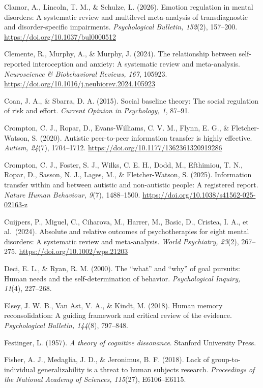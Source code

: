 \documentclass[
  11pt,
]{article}
\begin{document}
Clamor, A., Lincoln, T. M., \& Schulze, L. (2026). Emotion regulation in
mental disorders: A systematic review and multilevel meta-analysis of
transdiagnostic and disorder-specific impairments. \emph{Psychological
Bulletin, 152}(2), 157--200. \url{https://doi.org/10.1037/bul0000512}

Clemente, R., Murphy, A., \& Murphy, J. (2024). The relationship between
self-reported interoception and anxiety: A systematic review and
meta-analysis. \emph{Neuroscience \& Biobehavioral Reviews, 167},
105923. \url{https://doi.org/10.1016/j.neubiorev.2024.105923}

Coan, J. A., \& Sbarra, D. A. (2015). Social baseline theory: The social
regulation of risk and effort. \emph{Current Opinion in Psychology, 1},
87--91.

Crompton, C. J., Ropar, D., Evans-Williams, C. V. M., Flynn, E. G., \&
Fletcher-Watson, S. (2020). Autistic peer-to-peer information transfer
is highly effective. \emph{Autism, 24}(7), 1704--1712.
\url{https://doi.org/10.1177/1362361320919286}

Crompton, C. J., Foster, S. J., Wilks, C. E. H., Dodd, M., Efthimiou, T.
N., Ropar, D., Sasson, N. J., Lages, M., \& Fletcher-Watson, S. (2025).
Information transfer within and between autistic and non-autistic
people: A registered report. \emph{Nature Human Behaviour, 9}(7),
1488--1500. \url{https://doi.org/10.1038/s41562-025-02163-z}

Cuijpers, P., Miguel, C., Ciharova, M., Harrer, M., Basic, D., Cristea,
I. A., et al.~(2024). Absolute and relative outcomes of psychotherapies
for eight mental disorders: A systematic review and meta-analysis.
\emph{World Psychiatry, 23}(2), 267--275.
\url{https://doi.org/10.1002/wps.21203}

Deci, E. L., \& Ryan, R. M. (2000). The ``what'' and ``why'' of goal
pursuits: Human needs and the self-determination of behavior.
\emph{Psychological Inquiry, 11}(4), 227--268.

Elsey, J. W. B., Van Ast, V. A., \& Kindt, M. (2018). Human memory
reconsolidation: A guiding framework and critical review of the
evidence. \emph{Psychological Bulletin, 144}(8), 797--848.

Festinger, L. (1957). \emph{A theory of cognitive dissonance}. Stanford
University Press.

Fisher, A. J., Medaglia, J. D., \& Jeronimus, B. F. (2018). Lack of
group-to-individual generalizability is a threat to human subjects
research. \emph{Proceedings of the National Academy of Sciences,
115}(27), E6106--E6115.
\end{document}
